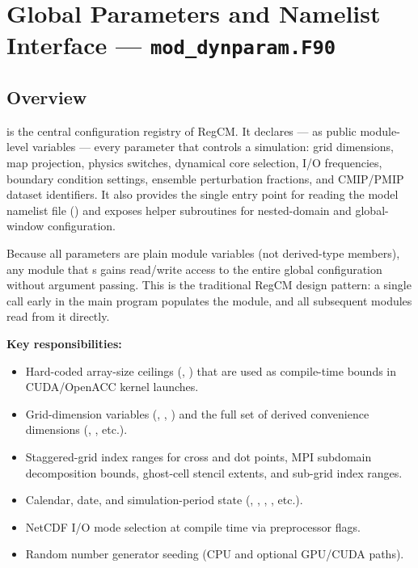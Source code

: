 \section{Global Parameters and Namelist Interface --- \texttt{mod\_dynparam.F90}}
\label{sec:dynparam}

\subsection{Overview}

 is the central configuration registry of RegCM. It
declares --- as public module-level variables --- every parameter that
controls a simulation: grid dimensions, map projection, physics switches,
dynamical core selection, I/O frequencies, boundary condition settings,
ensemble perturbation fractions, and CMIP/PMIP dataset identifiers. It also
provides the single entry point for reading the model namelist file
() and exposes helper subroutines for nested-domain and
global-window configuration.

Because all parameters are plain module variables (not derived-type members),
any module that s  gains read/write access to
the entire global configuration without argument passing. This is the
traditional RegCM design pattern: a single  call early in
the main program populates the module, and all subsequent modules read from
it directly.

\textbf{Key responsibilities:}
\begin{itemize}
  \item Hard-coded array-size ceilings (, )
        that are used as compile-time bounds in CUDA/OpenACC kernel launches.
  \item Grid-dimension variables (, , ) and the
        full set of derived convenience dimensions (, ,
        etc.).
  \item Staggered-grid index ranges for cross and dot points, MPI
        subdomain decomposition bounds, ghost-cell stencil extents, and
        sub-grid index ranges.
  \item Calendar, date, and simulation-period state (,
        , , , etc.).
  \item NetCDF I/O mode selection at compile time via preprocessor flags.
  \item Random number generator seeding (CPU and optional GPU/CUDA paths).
\end{itemize}

